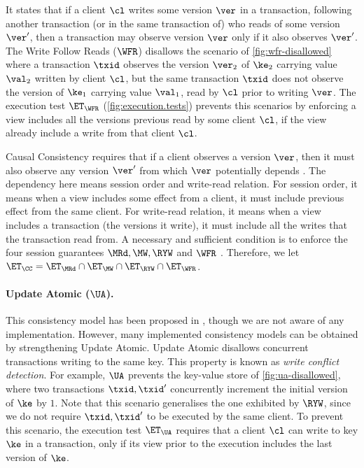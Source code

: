 It states that if a client \( \cl \) writes some version $\ver$ in a transaction,
following  another transaction (or in the same transaction of) who reads of some version $\ver'$, 
then a transaction may observe version $\ver$ only if it also observes $\ver'$. 
The Write Follow Reads ($\WFR$) disallows the scenario of \cref{fig:wfr-disallowed} 
where a transaction $\txid$ observes the version $\ver_2$ of $\ke_2$ carrying value $\val_2$ written by client $\cl$,
but the same transaction $\txid$ does not observe the version of $\ke_1$ carrying value $\val_1$, read by $\cl$ prior to writing $\ver$. 
The execution test $\ET_{\WFR}$ (\cref{fig:execution.tests}) prevents this scenarios 
by enforcing a view includes all the versions previous read by some client \( \cl \), 
if the view already include a write from that client \( \cl \).

Causal Consistency requires that if a client observes a version $\ver$, 
then it must also observe any version $\ver'$ from which $\ver$ potentially depends \cite{cops}. 
The dependency here means session order and write-read relation.
For session order, it means when a view includes some effect from a client, 
it must include previous effect from the same client.
For write-read relation, it means when a view includes a transaction (the versions it write),
it must include all the writes that the transaction read from.
A necessary and sufficient condition is to enforce the four session guarantees $\MRd, \MW, \RYW$ and $\WFR$ \cite{session2causal}.
Therefore, we let $\ET_{\CC} = \ET_{\MRd} \cap \ET_{\MW} \cap \ET_{\RYW} \cap \ET_{\WFR}$. 

\paragraph{Update Atomic ($\UA$).}
This consistency model has been proposed in \cite{framework-concur}, 
though we are not aware of any implementation. 
However, many implemented consistency models can be obtained by strengthening Update Atomic.
Update Atomic disallows concurrent transactions writing to the same key. 
This property is known as \emph{write conflict detection}.
For example, $\UA$ prevents the key-value store of \cref{fig:ua-disallowed},
where two transactions $\txid, \txid'$ concurrently increment the initial version of $\ke$ by $1$.
Note that this scenario generalises the one exhibited by $\RYW$, 
since we do not require $\txid, \txid'$ to be executed by the same client.
To prevent this scenario, the execution test $\ET_\UA$ requires that 
a client $\cl$ can write to key $\ke$ in a transaction,
only if its view prior to the execution includes the last version of
$\ke$.


